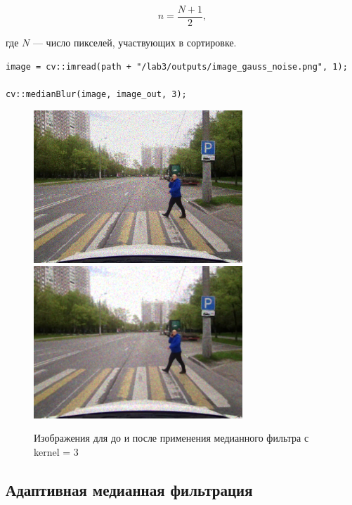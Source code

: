 \begin{equation}
    n = \frac{N + 1}{2},
\label{eq:complex_func}
\end{equation}

где $N$ — число пикселей, участвующих в сортировке.

\begin{lstlisting}[style=cpp_white, caption={Исходный код медианного фильтра}]
image = cv::imread(path + "/lab3/outputs/image_gauss_noise.png", 1);

cv::medianBlur(image, image_out, 3);
\end{lstlisting}
\pagebreak

\begin{figure}[ht]
    \centering
    \includegraphics[width=0.7\textwidth]{../outputs/image_mltp_noise.png}
    \includegraphics[width=0.7\textwidth]{../outputs/image_mltp_median_filter_k3.png}
    \caption{Изображения для до и после применения медианного фильтра с kernel = 3}
    \label{fig:stitch_images}
\end{figure}

\pagebreak

\subsection{Адаптивная медианная фильтрация}

